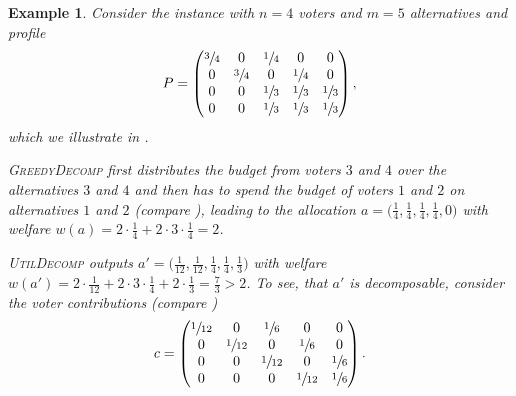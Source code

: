 \documentclass[11pt]{article}
\newcommand{\GrdDec}{\textsc{GreedyDecomp} }
\newcommand{\UtDec}{\textsc{UtilDecomp} }
\newtheorem{example}{Example}
\begin{document}
\begin{example}\label{ex:greedydecomp_social_welfare_small}
    Consider the instance with $n = 4$ voters and $m=5$ alternatives and profile
    \[
        P = \begin{pmatrix}
            \sfrac{3}{4} & 0 & \sfrac{1}{4} & 0 & 0 \\
            0 & \sfrac{3}{4} & 0 & \sfrac{1}{4} & 0 \\
            0 & 0 & \sfrac{1}{3} & \sfrac{1}{3} & \sfrac{1}{3} \\
            0 & 0 & \sfrac{1}{3} & \sfrac{1}{3} & \sfrac{1}{3} \\
        \end{pmatrix},
    \]
    which we illustrate in .

    \GrdDec first distributes the budget from voters $3$ and $4$ over the alternatives $3$ and $4$ and then has to spend the budget of voters $1$ and $2$  on alternatives $1$ and $2$  (compare ), leading to the allocation $a = \big(\frac{1}{4}, \frac{1}{4}, \frac{1}{4}, \frac{1}{4}, 0\big)$ with welfare $w(a) = 2 \cdot \frac{1}{4} + 2 \cdot 3 \cdot \frac{1}{4} = 2$.

    \UtDec outputs $a' = \big(\frac{1}{12}, \frac{1}{12}, \frac{1}{4}, \frac{1}{4}, \frac{1}{3}\big)$ with welfare $w(a') = 2 \cdot \frac{1}{12} + 2 \cdot 3 \cdot \frac{1}{4} + 2 \cdot \frac{1}{3} = \frac{7}{3} > 2$. To see, that $a'$ is decomposable, consider the voter contributions (compare )
    \[
        c = \begin{pmatrix}
            \sfrac{1}{12} & 0 & \sfrac{1}{6} & 0 & 0 \\
            0 & \sfrac{1}{12} & 0 & \sfrac{1}{6} & 0 \\
            0 & 0 & \sfrac{1}{12} & 0 & \sfrac{1}{6} \\
            0 & 0 & 0 & \sfrac{1}{12} & \sfrac{1}{6} \\
        \end{pmatrix}.
    \]
\end{example}
\end{document}
